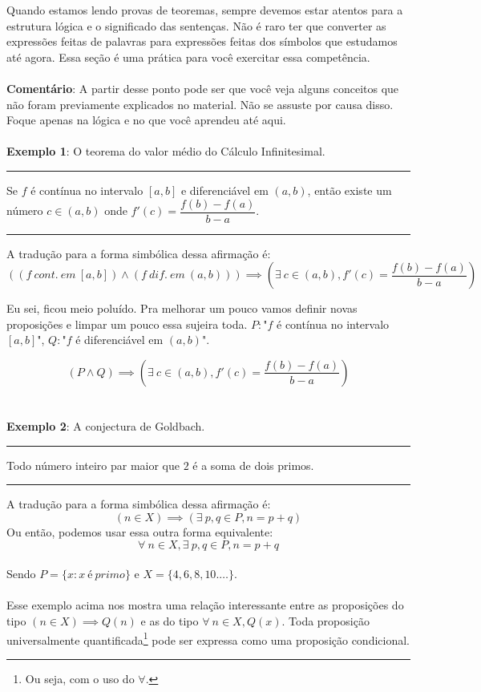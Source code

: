 \documentclass[a4paper,11pt]{book}
\theoremstyle{definition}
\theoremstyle{break}
\begin{document}
Quando estamos lendo provas de teoremas, sempre devemos estar atentos para a estrutura lógica e o significado das sentenças. Não é raro ter que converter as expressões feitas de palavras para expressões feitas dos símbolos que estudamos até agora. Essa seção é uma prática para você exercitar essa competência.
\\
\\
\textbf{Comentário}: A partir desse ponto pode ser que você veja alguns conceitos que não foram previamente explicados no material. Não se assuste por causa disso. Foque apenas na lógica e no que você aprendeu até aqui.
\\
\\
\textbf{Exemplo 1}: O teorema do valor médio do Cálculo Infinitesimal.
\\
\hrule
\vspace{5pt}
Se $f$ é contínua no intervalo $[a,b]$ e diferenciável em $(a,b)$, então existe um número $c \in (a,b)$ onde $f'(c) = \dfrac{f(b) - f(a)}{b - a}$.
\vspace{5pt}
\hrule
\vspace{5pt}
A tradução para a forma simbólica dessa afirmação é:
$$ \left( (f \ cont. \ em \  [a,b]) \land (f \ dif. \ em \  (a,b)) \right) \implies \left(\exists \ c \in (a,b), f'(c) = \dfrac{f(b) - f(a)}{b - a} \right) $$

Eu sei, ficou meio poluído. Pra melhorar um pouco vamos definir novas proposições e limpar um pouco essa sujeira toda. $P : $"$f$ é contínua no intervalo $[a,b]$", $Q : $"$f$ é diferenciável em $(a,b)$".

$$ \left( P \land Q \right) \implies \left(\exists \ c \in (a,b), f'(c) = \dfrac{f(b) - f(a)}{b - a} \right) $$
\\
\\
\textbf{Exemplo 2}: A conjectura de Goldbach.
\\
\hrule
\vspace{5pt}
Todo número inteiro par maior que $2$ é a soma de dois primos.
\vspace{5pt}
\hrule
\vspace{5pt}
A tradução para a forma simbólica dessa afirmação é:
$$ \left( n \in X \right) \implies \left( \exists \ p,q \in P, n = p + q \right) $$
Ou então, podemos usar essa outra forma equivalente:
$$ \forall \ n \in X, \exists \ p,q \in P, n = p + q $$
\\
Sendo $P = \{x : x \ é \ primo \}$ e $X = \{ 4,6,8,10.\dots \}$. 
\\
\\
Esse exemplo acima nos mostra uma relação interessante entre as proposições do tipo $(n \in X) \implies Q(n)$ e as do tipo $\forall \ n \in X, Q(x)$. Toda proposição universalmente quantificada\footnote{Ou seja, com o uso do $\forall$.} pode ser expressa como uma proposição condicional.
\end{document}

